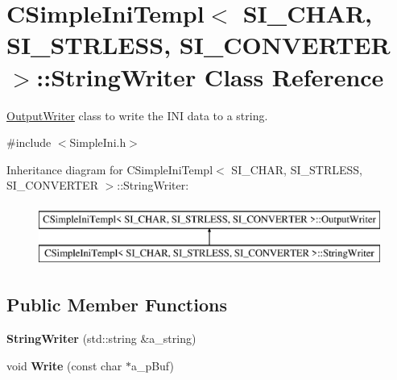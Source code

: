 \hypertarget{class_c_simple_ini_templ_1_1_string_writer}{}\section{C\+Simple\+Ini\+Templ$<$ S\+I\+\_\+\+C\+H\+AR, S\+I\+\_\+\+S\+T\+R\+L\+E\+SS, S\+I\+\_\+\+C\+O\+N\+V\+E\+R\+T\+ER $>$\+:\+:String\+Writer Class Reference}
\label{class_c_simple_ini_templ_1_1_string_writer}


\hyperlink{class_c_simple_ini_templ_1_1_output_writer}{Output\+Writer} class to write the I\+NI data to a string.  




{\ttfamily \#include $<$Simple\+Ini.\+h$>$}

Inheritance diagram for C\+Simple\+Ini\+Templ$<$ S\+I\+\_\+\+C\+H\+AR, S\+I\+\_\+\+S\+T\+R\+L\+E\+SS, S\+I\+\_\+\+C\+O\+N\+V\+E\+R\+T\+ER $>$\+:\+:String\+Writer\+:\begin{figure}[H]
\begin{center}
\leavevmode
\includegraphics[height=2.000000cm]{class_c_simple_ini_templ_1_1_string_writer}
\end{center}
\end{figure}
\subsection*{Public Member Functions}
\begin{DoxyCompactItemize}
\item 
{\bfseries String\+Writer} (std\+::string \&a\+\_\+string)\hypertarget{class_c_simple_ini_templ_1_1_string_writer_ad50338a07a9b6de7e4a78d0bbc11f67b}{}\label{class_c_simple_ini_templ_1_1_string_writer_ad50338a07a9b6de7e4a78d0bbc11f67b}

\item 
void {\bfseries Write} (const char $\ast$a\+\_\+p\+Buf)\hypertarget{class_c_simple_ini_templ_1_1_string_writer_afdfd0dfe71278ea7490a9d4ef6bffadc}{}\label{class_c_simple_ini_templ_1_1_string_writer_afdfd0dfe71278ea7490a9d4ef6bffadc}

\end{DoxyCompactItemize}


